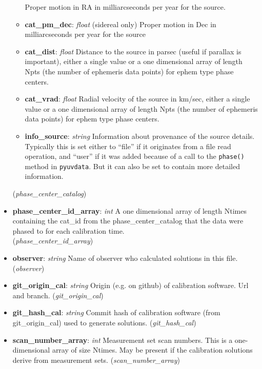 \documentclass[11pt, oneside]{article}
\begin{document}
\begin{itemize}
\begin{itemize}
	  Proper motion in RA in milliarcseconds per year for the source.
	\item \textbf{cat\_pm\_dec}: \textit{float} (sidereal only)
	  Proper motion in Dec in milliarcseconds per year for the source
	\item \textbf{cat\_dist}: \textit{float}
	  Distance to the source in parsec (useful if parallax is important), either a
	  single value or a one dimensional array of length Npts
	  (the number of ephemeris data points) for ephem type phase centers.
	\item \textbf{cat\_vrad}: \textit{float }
	  Radial velocity of the source in km/sec, either a single value or a
	  one dimensional array of length Npts (the number of ephemeris data points)
	  for ephem type phase centers.
	\item \textbf{info\_source}: \textit{string} Information about provenance of the source details.
	  Typically this is set either to ``file'' if it originates from a file read operation, and ``user'' if
	  it was added because of a call to the \texttt{phase()} method in \texttt{pyuvdata}. But it
	  can also be set to contain more detailed information.
	\end{itemize} (\textit{phase\_center\_catalog})
\item \textbf{phase\_center\_id\_array}: \textit{int}
A one dimensional array of length Ntimes containing the cat\_id from the phase\_center\_catalog
that the data were phased to for each calibration time. \\(\textit{phase\_center\_id\_array})

\item \textbf{observer}: \textit{string}  Name of observer who calculated solutions in this file.
  (\textit{observer})
\item \textbf{git\_origin\_cal}: \textit{string}  Origin (e.g. on github) of calibration software.
  Url and branch. (\textit{git\_origin\_cal})
\item \textbf{git\_hash\_cal}: \textit{string}  Commit hash of calibration software
  (from git\_origin\_cal) used to generate solutions.
  (\textit{git\_hash\_cal})

\item \textbf{scan\_number\_array}: \textit{int} Measurement set scan numbers.
  This is a one-dimensional array of size Ntimes.  May be present if the calibration
  solutions derive from measurement sets.
  (\textit{scan\_number\_array})

 \end{itemize}
\end{document}
